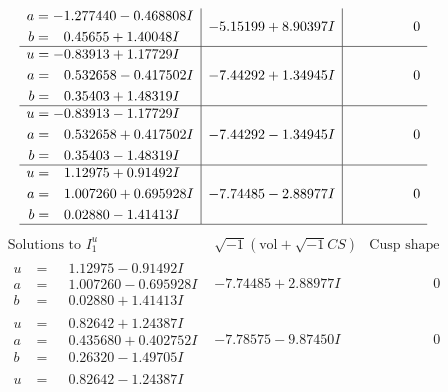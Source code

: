 \documentclass[1p]{elsarticle_modified}
\theoremstyle{definition}
\newcommand{\I}{\sqrt{-1}}
\begin{document}
$$\begin{array}{c|c|c}
\begin{aligned}
a &= -1.277440 - 0.468808 I \\
b &= \phantom{-}0.45655 + 1.40048 I\end{aligned}
 & -5.15199 + 8.90397 I & \phantom{-0.000000 } 0 \\ \hline\begin{aligned}
u &= -0.83913 + 1.17729 I \\
a &= \phantom{-}0.532658 - 0.417502 I \\
b &= \phantom{-}0.35403 + 1.48319 I\end{aligned}
 & -7.44292 + 1.34945 I & \phantom{-0.000000 } 0 \\ \hline\begin{aligned}
u &= -0.83913 - 1.17729 I \\
a &= \phantom{-}0.532658 + 0.417502 I \\
b &= \phantom{-}0.35403 - 1.48319 I\end{aligned}
 & -7.44292 - 1.34945 I & \phantom{-0.000000 } 0 \\ \hline\begin{aligned}
u &= \phantom{-}1.12975 + 0.91492 I \\
a &= \phantom{-}1.007260 + 0.695928 I \\
b &= \phantom{-}0.02880 - 1.41413 I\end{aligned}
 & -7.74485 - 2.88977 I & \phantom{-0.000000 } 0\\
 \hline 
 \end{array}$$\newpage$$\begin{array}{c|c|c}  
\text{Solutions to }I^u_{1}& \I (\text{vol} + \sqrt{-1}CS) & \text{Cusp shape}\\
 \hline 
\begin{aligned}
u &= \phantom{-}1.12975 - 0.91492 I \\
a &= \phantom{-}1.007260 - 0.695928 I \\
b &= \phantom{-}0.02880 + 1.41413 I\end{aligned}
 & -7.74485 + 2.88977 I & \phantom{-0.000000 } 0 \\ \hline\begin{aligned}
u &= \phantom{-}0.82642 + 1.24387 I \\
a &= \phantom{-}0.435680 + 0.402752 I \\
b &= \phantom{-}0.26320 - 1.49705 I\end{aligned}
 & -7.78575 - 9.87450 I & \phantom{-0.000000 } 0 \\ \hline\begin{aligned}
u &= \phantom{-}0.82642 - 1.24387 I \\

\end{aligned}
\end{array}$$
\end{document}

